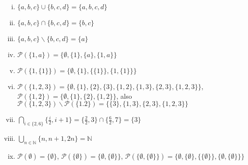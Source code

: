  \begin{loesung}
\begin{enumerate}[(i)]
\item $\{a,b,c\}\cup \{b,c,d\}=\{a,b,c,d\}$
\item $\{a,b,c\}\cap \{b,c,d\}=\{b,c\}$
\item $\{a,b,c\}\backslash \{b,c,d\}=\{a\}$
\item $\mathscr{P}(\{1,a\})=\{\emptyset,\{1\},\{a\},\{1,a\}\}$
\item $\mathscr{P}(\{1,\{1\}\})=\{\emptyset,\{1\},\{\{1\}\},\{1,\{1\}\}\}$
\item $\mathscr{P}(\{1,2,3\})=\{\emptyset,\{1\},\{2\},\{3\},\{1,2\},\{1,3\},\{2,3\},\{1,2,3\}\}$, $\mathscr{P}(\{1,2\})=\{\emptyset,\{1\},\{2\},\{1,2\}\}$, also $\mathscr{P}(\{1,2,3\})\backslash\mathscr{P}(\{1.2\})=\{\{3\},\{1,3\},\{2,3\},\{1,2,3\}\}$
\item $\bigcap_{i\in\{2,6\}}\{\frac{i}{2},i+1\}=\{\frac{2}{2},3\}\cap\{\frac{6}{2},7\}=\{3\}$
\item $\bigcup_{n\in\mathbb{N}}\{n,n+1,2n\}=\mathbb{N}$
\item $\mathscr{P}(\emptyset)=\{\emptyset\}$, $\mathscr{P}(\{\emptyset\})=\{\emptyset,\{\emptyset\}\}$, $\mathscr{P}(\{\emptyset,\{\emptyset\}\})=\{\emptyset,\{\emptyset\},\{\{\emptyset\}\}, \{\emptyset,\{\emptyset\}\}\}$
\end{enumerate}
 \end{loesung}








